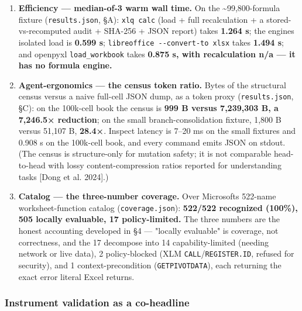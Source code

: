 \documentclass[
]{article}
\begin{document}
\begin{enumerate}
  checked semantically. The fixtures contain no VBA, charts, or pivot
  tables (the engine cannot author them), so the irreversible-loss
  failure of {[}claude-code\#22044{]} is untested here, not disproven.
\item
  \textbf{Efficiency --- median-of-3 warm wall time.} On the
  \textasciitilde99,800-formula fixture (\texttt{results.json}, §A):
  \texttt{xlq\ calc} (load + full recalculation + a stored-vs-recomputed
  audit + SHA-256 + JSON report) takes \textbf{1.264 s}; the
  engine\textquotesingle s isolated load is \textbf{0.599 s};
  \texttt{libreoffice\ -\/-convert-to\ xlsx} takes \textbf{1.494 s}; and
  openpyxl \texttt{load\_workbook} takes \textbf{0.875 s, with
  recalculation n/a --- it has no formula engine.}
\item
  \textbf{Agent-ergonomics --- the census token ratio.} Bytes of the
  structural census versus a naive full-cell JSON dump, as a token proxy
  (\texttt{results.json}, §C): on the 100k-cell book the census is
  \textbf{999 B versus 7,239,303 B, a 7,246.5× reduction}; on the small
  branch-consolidation fixture, 1,800 B versus 51,107 B, \textbf{28.4×}.
  Inspect latency is 7--20 ms on the small fixtures and 0.908 s on the
  100k-cell book, and every command emits JSON on stdout. (The census is
  structure-only for mutation safety; it is not comparable head-to-head
  with lossy content-compression ratios reported for understanding tasks
  {[}Dong et al. 2024{]}.)
\item
  \textbf{Catalog --- the three-number coverage.} Over
  Microsoft\textquotesingle s 522-name worksheet-function catalog
  (\texttt{coverage.json}): \textbf{522/522 recognized (100\%), 505
  locally evaluable, 17 policy-limited.} The three numbers are the
  honest accounting developed in §4 --- "locally evaluable" is coverage,
  not correctness, and the 17 decompose into 14 capability-limited
  (needing network or live data), 2 policy-blocked (XLM
  \texttt{CALL}/\texttt{REGISTER.ID}, refused for security), and 1
  context-precondition (\texttt{GETPIVOTDATA}), each returning the exact
  error literal Excel returns.
\end{enumerate}

\subsubsection{Instrument validation as a
co-headline}\label{instrument-validation-as-a-co-headline}
\end{document}
